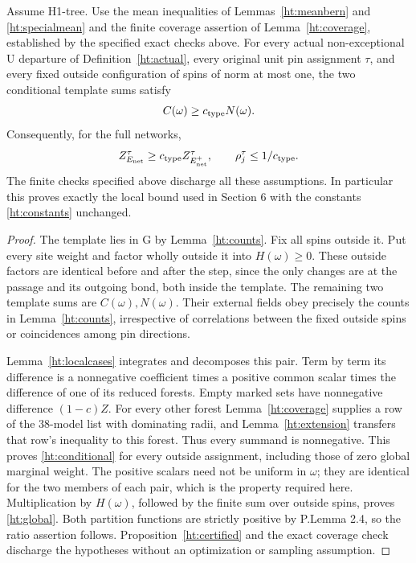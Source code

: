 \begin{htthm}
\label{ht:reduction}
Assume H1-tree. Use the mean inequalities of
Lemmas~\ref{ht:meanbern} and \ref{ht:specialmean} and the finite
coverage assertion of Lemma~\ref{ht:coverage}, established by the
specified exact checks above. For every actual non-exceptional U departure
of Definition~\ref{ht:actual}, every original unit pin assignment
\(\tau\), and every fixed outside configuration of spins of norm
at most one, the two conditional template sums satisfy
\begin{equation}\label{ht:conditional}
 C(\omega)\ge c_{\rm type}N(\omega).
\end{equation}
Consequently, for the full networks,
\begin{equation}\label{ht:global}
 Z_{E_{\rm net}}^\tau\ge c_{\rm type}
                         Z_{E_{\rm net}^{+}}^\tau,
 \qquad \rho_j^\tau\le1/c_{\rm type}.
\end{equation}
The finite checks specified above discharge all these assumptions.
In particular this proves exactly the local bound used in Section 6
with the constants \eqref{ht:constants} unchanged.
\end{htthm}
\begin{proof}
The template lies in G by Lemma~\ref{ht:counts}. Fix all spins outside
it. Put every site weight and factor wholly outside it into
\(H(\omega)\ge0\). These outside factors are identical before and
after the step, since the only changes are at the passage and its
outgoing bond, both inside the template. The remaining two template
sums are \(C(\omega),N(\omega)\). Their external fields obey precisely
the counts in Lemma~\ref{ht:counts}, irrespective of correlations
between the fixed outside spins or coincidences among pin directions.

Lemma~\ref{ht:localcases} integrates and decomposes this pair. Term
by term its difference is a nonnegative coefficient times a positive
common scalar times the difference of one of its reduced forests.
Empty marked sets have nonnegative difference \((1-c)Z\). For every
other forest Lemma~\ref{ht:coverage} supplies a row of the 38-model
list with dominating radii, and Lemma~\ref{ht:extension} transfers that
row's inequality to this forest. Thus every summand is nonnegative.
This proves \eqref{ht:conditional} for every outside assignment,
including those of zero global marginal weight. The positive scalars
need not be uniform in \(\omega\); they are identical for the two
members of each pair, which is the property required here.
Multiplication by \(H(\omega)\), followed by the finite sum over outside
spins, proves \eqref{ht:global}. Both partition functions are strictly
positive by P.Lemma 2.4, so the ratio assertion follows.
Proposition~\ref{ht:certified} and the exact coverage check discharge
the hypotheses without an optimization or sampling assumption.
\end{proof}

